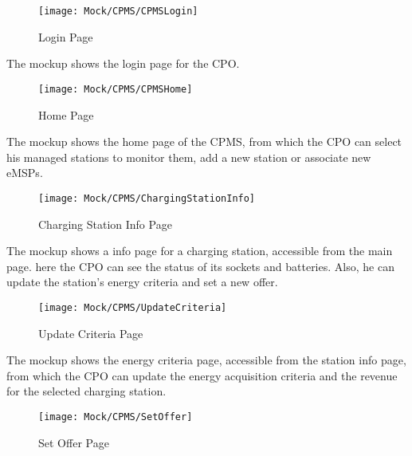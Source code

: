 \begin{figure}[H]
    \begin{center}
    \texttt{[image: Mock/CPMS/CPMSLogin]}
    \caption{Login Page}
    \label{fig:CPMSLogin}
    \end{center}
\end{figure}
The mockup shows the login page for the CPO.
\begin{figure}[H]
    \begin{center}
    \texttt{[image: Mock/CPMS/CPMSHome]}
    \caption{Home Page}
    \label{fig:CPMSHome}
    \end{center}
\end{figure}
The mockup shows the home page of the CPMS, from which the CPO can select his managed stations to monitor them, add a new station or associate new eMSPs.
\begin{figure}[H]
    \begin{center}
    \texttt{[image: Mock/CPMS/ChargingStationInfo]}
    \caption{Charging Station Info Page}
    \label{fig:ChargingStationInfo}
    \end{center}
\end{figure}
The mockup shows a info page for a charging station, accessible from the main page. here the CPO can see the status of its sockets and batteries. Also, he can update the station's energy criteria and set a new offer.
\begin{figure}[H]
    \begin{center}
    \texttt{[image: Mock/CPMS/UpdateCriteria]}
    \caption{Update Criteria Page}
    \label{fig:CPMSLogin}
    \end{center}
\end{figure}
The mockup shows the energy criteria page, accessible from the station info page, from which the CPO can update the energy acquisition criteria and the revenue for the selected charging station.
\begin{figure}[H]
    \begin{center}
    \texttt{[image: Mock/CPMS/SetOffer]}
    \caption{Set Offer Page}
    \label{fig:SetOffer}
    \end{center}
\end{figure}
